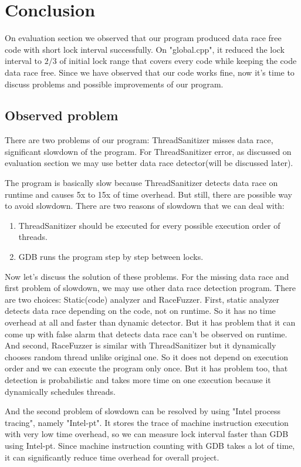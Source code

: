 \section{Conclusion}
On evaluation section we observed that our program produced data race free code with short lock interval successfully. On "global.cpp", it reduced the lock interval to $2/3$ of initial lock range that covers every code while keeping the code data race free. Since we have observed that our code works fine, now it's time to discuss problems and possible improvements of our program.

\subsection{Observed problem}
There are two problems of our program: ThreadSanitizer misses data race, significant slowdown of the program. For ThreadSanitizer error, as discussed on evaluation section we may use better data race detector(will be discussed later).

The program is basically slow because ThreadSanitizer detects data race on runtime and causes 5x to 15x of time overhead. But still, there are possible way to avoid slowdown. There are two reasons of slowdown that we can deal with:

\begin{enumerate}
    \item ThreadSanitizer should be executed for every possible execution order of threads.
    \item GDB runs the program step by step between locks.
\end{enumerate}

Now let's discuss the solution of these problems. For the missing data race and first problem of slowdown, we may use other data race detection program. There are two choices: Static(code) analyzer and RaceFuzzer. First, static analyzer detects data race depending on the code, not on runtime. So it has no time overhead at all and faster than dynamic detector. But it has problem that it can come up with false alarm that detects data race can't be observed on runtime. And second, RaceFuzzer is similar with ThreadSanitizer but it dynamically chooses random thread unlike original one. So it does not depend on execution order and we can execute the program only once. But it has problem too, that detection is probabilistic and takes more time on one execution because it dynamically schedules threads.

And the second problem of slowdown can be resolved by using "Intel process tracing", namely "Intel-pt". It stores the trace of machine instruction execution with very low time overhead, so we can measure lock interval faster than GDB using Intel-pt. Since machine instruction counting with GDB takes a lot of time, it can significantly reduce time overhead for overall project.

